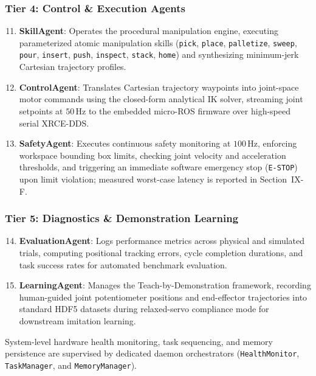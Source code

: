 \documentclass[journal]{IEEEtran}
\begin{document}
\subsubsection{Tier 4: Control \& Execution Agents}
\begin{enumerate}
    \setcounter{enumi}{10}
    \item \textbf{SkillAgent}: Operates the procedural manipulation engine, executing parameterized atomic manipulation skills (\texttt{pick}, \texttt{place}, \texttt{palletize}, \texttt{sweep}, \texttt{pour}, \texttt{insert}, \texttt{push}, \texttt{inspect}, \texttt{stack}, \texttt{home}) and synthesizing minimum-jerk Cartesian trajectory profiles.
    \item \textbf{ControlAgent}: Translates Cartesian trajectory waypoints into joint-space motor commands using the closed-form analytical IK solver, streaming joint setpoints at $50$\,Hz to the embedded micro-ROS firmware over high-speed serial XRCE-DDS.
    \item \textbf{SafetyAgent}: Executes continuous safety monitoring at $100$\,Hz, enforcing workspace bounding box limits, checking joint velocity and acceleration thresholds, and triggering an immediate software emergency stop (\texttt{E-STOP}) upon limit violation; measured worst-case latency is reported in Section~IX-F.
\end{enumerate}

\subsubsection{Tier 5: Diagnostics \& Demonstration Learning}
\begin{enumerate}
    \setcounter{enumi}{13}
    \item \textbf{EvaluationAgent}: Logs performance metrics across physical and simulated trials, computing positional tracking errors, cycle completion durations, and task success rates for automated benchmark evaluation.
    \item \textbf{LearningAgent}: Manages the Teach-by-Demonstration framework, recording human-guided joint potentiometer positions and end-effector trajectories into standard HDF5 datasets during relaxed-servo compliance mode for downstream imitation learning.
\end{enumerate}
System-level hardware health monitoring, task sequencing, and memory persistence are supervised by dedicated daemon orchestrators (\texttt{HealthMonitor}, \texttt{TaskManager}, and \texttt{MemoryManager}).
\end{document}
